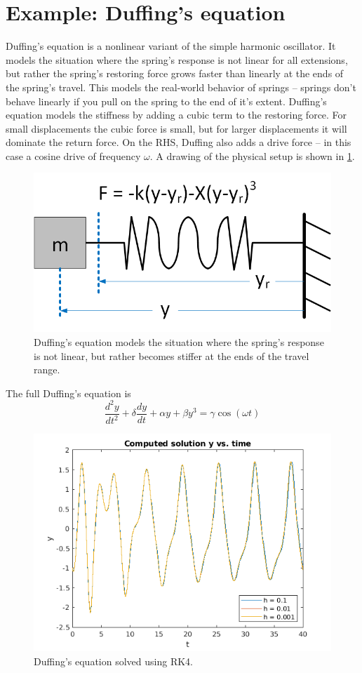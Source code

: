 \documentclass[hidelinks,notitlepage]{book}
\begin{document}
\section{Example: Duffing's equation}
Duffing's equation is a nonlinear variant of the simple harmonic oscillator.  It models the situation where the spring's response is not linear for all extensions, but rather the spring's restoring force grows faster than linearly at the ends of the spring's travel.  This models the real-world behavior of springs -- springs don't behave linearly if you pull on the spring to the end of it's extent.  Duffing's equation models the stiffness by adding a cubic term to the restoring force.  For small displacements the cubic force is small, but for larger displacements it will dominate the return force.  On the RHS, Duffing also adds a drive force -- in this case a cosine drive of frequency $\omega$.  
A drawing of the physical setup is shown in \cref{fig:DuffingsEq}.
\begin{figure}[tbh]
	\centering
	\includegraphics[width=0.7\columnwidth]{DuffingsEq.png}
	\caption{Duffing's equation models the situation where the spring's response is not linear, but rather becomes stiffer at the ends of the travel range.}
	\label{fig:DuffingsEq}
\end{figure}
The full Duffing's equation is
\begin{equation}
\label{eq:DuffingsEq}
\frac{d^2 y}{d t^2} + \delta \frac{d y}{d t} + \alpha y + \beta y^3 = \gamma \cos(\omega t)
\end{equation}

\begin{figure}[tbh]
	\centering
	\includegraphics[width=0.7\columnwidth]{RK4Duffings.png}
	\caption{Duffing's equation solved using RK4.}
	\label{fig:RK4Duffings}
\end{figure}
\end{document}
